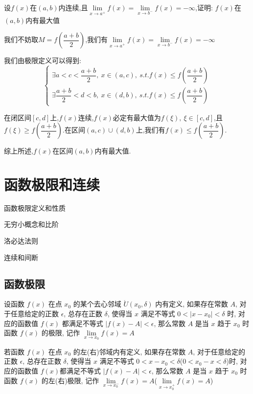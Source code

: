 \begin{proposition}
	设$f(x)$在$(a,b)$内连续,且$\lim\limits_{x\rightarrow a^{+}}f(x)=\lim\limits_{x\rightarrow b^{-}}f(x)=-\infty$,证明:  $f(x)$在$(a,b)$内有最大值
\end{proposition}
\begin{solution}
	
	我们不妨取$M=f(\dfrac{a+b}{2})$,我们有$\lim\limits_{x\rightarrow a^{+}}f(x)=\lim\limits_{x\rightarrow b^{-}}f(x)=-\infty$
	
	我们由极限定义可以得到:  
	$$\left\lbrace
	\begin{array}{l}
		\exists a<c<\dfrac{a+b}{2},\ x\in(a,c),\ s.t. f(x)\leq f(\dfrac{a+b}{2})\\
		\exists \dfrac{a+b}{2}<d<b,\ x\in(d,b),\ s.t. f(x)\leq f(\dfrac{a+b}{2})
	\end{array}
	\right. $$
	
	在闭区间$[c,d]$上,$f(x)$连续,$f(x)$必定有最大值为$f(\xi),\ \xi\in[c,d]$,且$f(\xi)\geq f(\dfrac{a+b}{2})$.在区间$(a,c)\cup (d,b)$上,我们有$f(x)\leq f(\dfrac{a+b}{2})$.
	
	综上所述,$f(x)$在区间$(a,b)$内有最大值.
\end{solution}


\chapter{函数极限和连续}
\begin{introduction}
	\item 函数极限定义和性质
	\item 无穷小概念和比阶
	\item 洛必达法则
	\item 连续和间断
\end{introduction}
\section{函数极限}
\begin{definition}[函数极限]
	设函数 $f(x)$ 在点 $x_{0}$ 的某个去心邻域 $\mathring{U}(x_{0},\delta)$ 内有定义, 如果存在常数 $A$, 对于任意给定的正数 $\epsilon$, 总存在正数 $\delta$, 使得当 $x$ 满足不等式 $0<|x-x_{0}|<\delta$ 时, 对应的函数值 $f(x)$ 都满足不等式 $|f(x)-A|<\epsilon$, 那么常数 $A$ 是当 $x$ 趋于 $x_{0}$ 时函数 $f(x)$ 的极限, 记作 $\lim\limits_{x\to x_{0}}f(x)=A$
\end{definition}

\begin{definition}[单侧极限]
	若函数 $f(x)$ 在点 $x_{0}$ 的左(右)邻域内有定义, 如果存在常数 $A$, 对于任意给定的正数 $\epsilon$, 总存在正数 $\delta$, 使得当 $x$ 满足不等式 $0<x-x_{0}<\delta$($0<x_{0}-x<\delta$)时, 对应的函数值 $f(x)$都满足不等式 $|f(x)-A|<\epsilon$, 那么常数 $A$ 是当 $x$ 趋于 $x_{0}$ 时函数 $f(x)$ 的左(右)极限, 记作 $\lim\limits_{x\to x_{0}^{-}}f(x)=A$($\lim\limits_{x\to x_{0}^{+}}f(x)=A$)
\end{definition}

